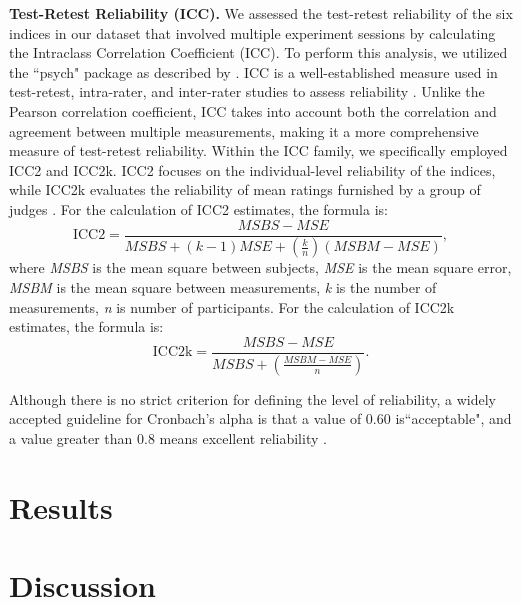 \documentclass[sn-apa]{sn-jnl}%
\theoremstyle{thmstyleone}%
\theoremstyle{thmstyletwo}%
\theoremstyle{thmstylethree}%
\begin{document}
\textbf{Test-Retest Reliability (ICC).} We assessed the test-retest reliability of the six indices in our dataset that involved multiple experiment sessions by calculating the Intraclass Correlation Coefficient (ICC). To perform this analysis, we utilized the ``psych" package as described by \parencite{revelle2017psych}. ICC is a well-established measure used in test-retest, intra-rater, and inter-rater studies to assess reliability \parencite{fisher1992statistical}. Unlike the Pearson correlation coefficient, ICC takes into account both the correlation and agreement between multiple measurements, making it a more comprehensive measure of test-retest reliability. Within the ICC family, we specifically employed ICC2 and ICC2k. ICC2 focuses on the individual-level reliability of the indices, while ICC2k evaluates the reliability of mean ratings furnished by a group of judges \parencite{koo2016a,liljequist2019intraclass}. For the calculation of ICC2 estimates, the formula is: 
\begin{equation}
	\text{ICC2}=\frac{M S B S-M S E}{M S B S+(k-1) M S E+\left(\frac{k}{n}\right)(M S B M-M S E)},
\end{equation}
where \textit{MSBS} is the mean square between subjects, \textit{MSE} is the mean square error, \textit{MSBM} is the mean square between measurements, \textit{k} is the number of measurements, \textit{n} is number of participants. For the calculation of ICC2k estimates, the formula is: 
\begin{equation}
	\text{ICC2k}=\frac{M S B S-M S E}{M S B S+\left(\frac{M S B M-M S E}{n}\right)}.
\end{equation}

Although there is no strict criterion for defining the level of reliability, a widely accepted guideline for Cronbach's alpha is that a value of 0.60 is``acceptable", and a value greater than 0.8 means excellent reliability \parencite{cicchetti1981developing,kupper2020on}. 

\section{Results}\label{sec4}
\section{Discussion}\label{sec5}
\end{document}
